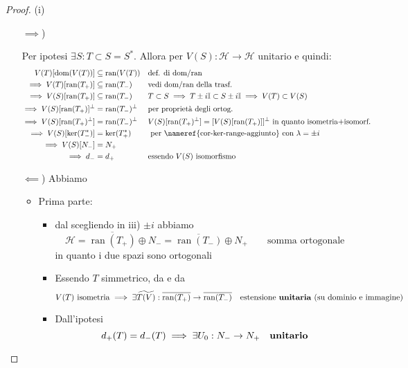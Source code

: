 \documentclass[a4paper,10pt]{article}
\theoremstyle{definition}
\DeclareMathOperator*{\ran}{ran}
\DeclareMathOperator*{\dom}{dom} %
\newcommand{\hil}{\mathcal{H}} %
\theoremstyle{indentdefinition}
\theoremstyle{indenttheorem}
\theoremstyle{myremark}
\theoremstyle{indentgeneral}
\begin{document}
\begin{proof} (i) 
\begin{itemize}
    \item[$\implies$)] 
    
    Per ipotesi $\exists S:T\subset S=S^*$. Allora per  $V(S):\hil\to\hil$ unitario e quindi:
    \begin{align*}
        V(T)[\dom(V(T))]&\subseteq \ran(V(T)) && \text{def. di dom/ran}\\
        \implies V(T)[\ran(T_+)]&\subseteq \ran(T_-)  && \text{vedi dom/ran della trasf.}\\
         \implies V(S)[\ran(T_+)]&\subseteq \ran(T_-)  &&  T\subset S\implies T\pm i\mathbb{I}\subset S\pm i\mathbb{I}\implies V(T)\subset V(S)\\
          \implies V(S)[\ran(T_+)]^\perp&= \ran(T_-)^\perp  && \text{per proprietà degli ortog.}\\
           \implies V(S)[\ran(T_+)^\perp]&= \ran(T_-)^\perp  && V(S)[\ran(T_+)^\perp]= [V(S)[\ran(T_+)]]^\perp \text{ in quanto isometria+isomorf.}\\
           \implies V(S)[\ker(T^*_-)]&= \ker(T^*_+)  && \text{ per \nameref{cor-ker-range-aggiunto} con $\lambda=\pm i$}\\
           \implies V(S)[N_-]&=N_+ \\
           \implies d_-&=d_+ &&\text{essendo $V(S)$ isomorfismo}
    \end{align*}
    \item[$\impliedby$)] Abbiamo
    \begin{itemize}
        \item Prima parte:\begin{itemize}
        \item dal  scegliendo in iii) $\pm i$ abbiamo
        $$\hil=\overline{\ran(T_+)}\oplus N_-=\overline{\ran(T_-)}\oplus N_+ \qquad \text{somma ortogonale}$$
        in quanto i due spazi sono ortogonali
        \item Essendo $T$ simmetrico, da  e da 
        $$V(T) \text{ isometria} \implies\exists \widetilde{T(V)}:\overline{\ran(T_+)}\to\overline{\ran(T_-)}\quad \text{estensione \textbf{unitaria} (su dominio e immagine)}$$
        \item Dall'ipotesi
        $$d_+(T)=d_-(T)\implies\exists U_0:N_-\to N_+\quad \text{\textbf{unitario}}$$
    \end{itemize}

\end{itemize}
\end{itemize}
\end{proof}
\end{document}
